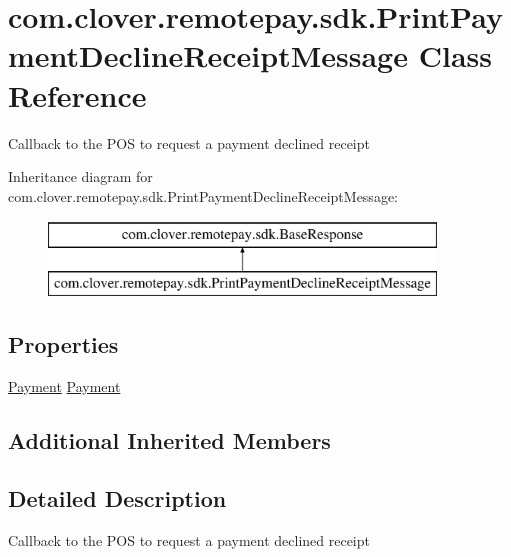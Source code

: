 \hypertarget{classcom_1_1clover_1_1remotepay_1_1sdk_1_1_print_payment_decline_receipt_message}{}\section{com.\+clover.\+remotepay.\+sdk.\+Print\+Payment\+Decline\+Receipt\+Message Class Reference}
\label{classcom_1_1clover_1_1remotepay_1_1sdk_1_1_print_payment_decline_receipt_message}


Callback to the P\+OS to request a payment declined receipt  


Inheritance diagram for com.\+clover.\+remotepay.\+sdk.\+Print\+Payment\+Decline\+Receipt\+Message\+:\begin{figure}[H]
\begin{center}
\leavevmode
\includegraphics[height=2.000000cm]{classcom_1_1clover_1_1remotepay_1_1sdk_1_1_print_payment_decline_receipt_message}
\end{center}
\end{figure}
\subsection*{Properties}
\begin{DoxyCompactItemize}
\item 
\hyperlink{classcom_1_1clover_1_1sdk_1_1v3_1_1payments_1_1_payment}{Payment} \hyperlink{classcom_1_1clover_1_1remotepay_1_1sdk_1_1_print_payment_decline_receipt_message_a8c10fc5bbfe151c7dc1e8f112614fac3}{Payment}
\end{DoxyCompactItemize}
\subsection*{Additional Inherited Members}


\subsection{Detailed Description}
Callback to the P\+OS to request a payment declined receipt 



